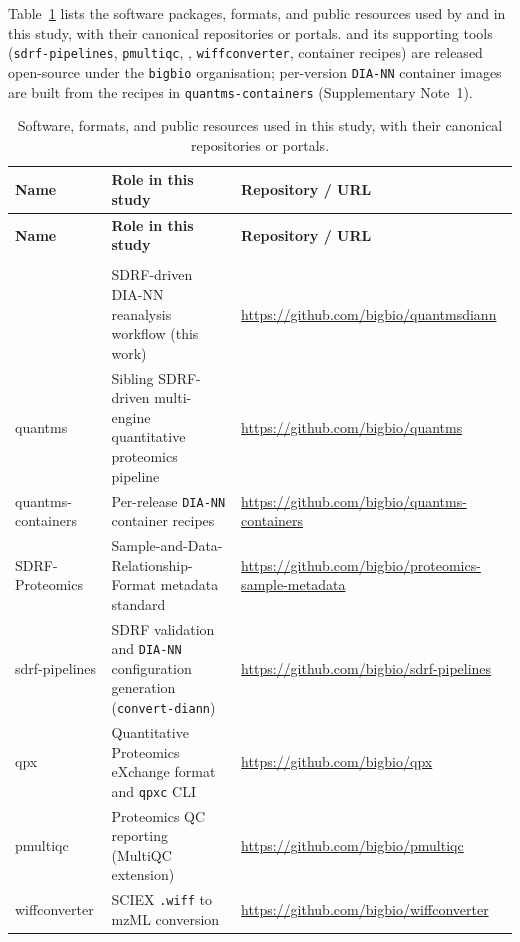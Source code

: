 \documentclass[preprint,12pt]{elsarticle}
\begin{document}
Table~\ref{tab:software-supp} lists the software packages, formats, and public
resources used by \quantmsdiann{} and in this study, with their canonical
repositories or portals. \quantmsdiann{} and its supporting tools
(\texttt{sdrf-pipelines}, \texttt{pmultiqc}, \qpx{}, \texttt{wiffconverter},
container recipes) are released open-source under the \texttt{bigbio}
organisation; per-version \texttt{DIA-NN} container images are built from the
recipes in \texttt{quantms-containers} (Supplementary Note~1).

{\footnotesize
\begin{longtable}{@{}>{\raggedright\arraybackslash}p{}>{\raggedright\arraybackslash}p{}>{\raggedright\arraybackslash}p{}@{}}
\caption{Software, formats, and public resources used in this study, with their
canonical repositories or portals.}\label{tab:software-supp}\\
\hline
\textbf{Name} & \textbf{Role in this study} & \textbf{Repository / URL} \\
\hline
\endfirsthead
\hline
\textbf{Name} & \textbf{Role in this study} & \textbf{Repository / URL} \\
\hline
\endhead
\hline
\endfoot
\multicolumn{3}{@{}l}{\textit{quantmsdiann and the bigbio ecosystem}} \\
\quantmsdiann{} & SDRF-driven DIA-NN reanalysis workflow (this work) & \url{https://github.com/bigbio/quantmsdiann} \\
quantms & Sibling SDRF-driven multi-engine quantitative proteomics pipeline & \url{https://github.com/bigbio/quantms} \\
quantms-containers & Per-release \texttt{DIA-NN} container recipes & \url{https://github.com/bigbio/quantms-containers} \\
SDRF-Proteomics & Sample-and-Data-Relationship-Format metadata standard & \url{https://github.com/bigbio/proteomics-sample-metadata} \\
sdrf-pipelines & SDRF validation and \texttt{DIA-NN} configuration generation (\texttt{convert-diann}) & \url{https://github.com/bigbio/sdrf-pipelines} \\
qpx & Quantitative Proteomics eXchange format and \texttt{qpxc} CLI & \url{https://github.com/bigbio/qpx} \\
pmultiqc & Proteomics QC reporting (MultiQC extension) & \url{https://github.com/bigbio/pmultiqc} \\
wiffconverter & SCIEX \texttt{.wiff} to mzML conversion & \url{https://github.com/bigbio/wiffconverter} \\

\end{longtable}}
\end{document}
